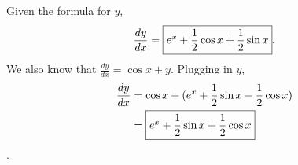 \documentclass{article}
\begin{document}
\begin{enumerate}
\begin{enumerate}
      \begin{solution}
      Given the formula for $y$,
      \begin{align*}
              \frac{dy}{dx}=\fbox{$e^x+\dfrac{1}{2}\cos x+\dfrac{1}{2}\sin x$}.
          \end{align*}
          We also know that $\frac{dy}{dx}=\cos x + y$. Plugging in $y$, 
          \begin{align*}
            \frac{dy}{dx}&=\cos x + (e^x+\dfrac{1}{2}\sin x-\dfrac{1}{2}\cos x)  \\ &=\fbox{$e^x+\dfrac{1}{2}\sin x+\dfrac{1}{2}\cos x$}
          \end{align*}.
      \end{solution}
      \pspace{\vfill}
  \end{enumerate}
 \end{enumerate}
\end{document}
